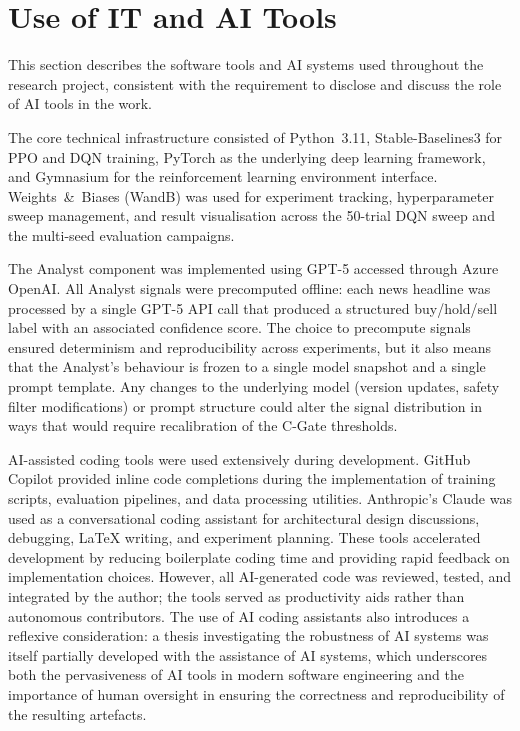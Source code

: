 \section{Use of IT and AI Tools}
\label{sec:disc-tools}

This section describes the software tools and AI systems used throughout the
research project, consistent with the requirement to disclose and discuss the
role of AI tools in the work.

The core technical infrastructure consisted of Python~3.11,
Stable-Baselines3 \cite{raffin2021stable} for PPO and DQN training,
PyTorch as the underlying deep learning framework, and Gymnasium for the
reinforcement learning environment interface. Weights~\&~Biases (WandB) was
used for experiment tracking, hyperparameter sweep management, and result
visualisation across the 50-trial DQN sweep and the multi-seed evaluation
campaigns.

The Analyst component was implemented using GPT-5 accessed through Azure
OpenAI. All Analyst signals were precomputed offline: each news headline
was processed by a single GPT-5 API call that produced a structured
buy/hold/sell label with an associated confidence score. The choice to
precompute signals ensured determinism and reproducibility across
experiments, but it also means that the Analyst's behaviour is frozen to a
single model snapshot and a single prompt template. Any changes to the
underlying model (version updates, safety filter modifications) or prompt
structure could alter the signal distribution in ways that would require
recalibration of the C-Gate thresholds.

AI-assisted coding tools were used extensively during development. GitHub
Copilot provided inline code completions during the implementation of
training scripts, evaluation pipelines, and data processing utilities.
Anthropic's Claude was used as a conversational coding assistant for
architectural design discussions, debugging, LaTeX writing, and
experiment planning. These tools accelerated development by reducing
boilerplate coding time and providing rapid feedback on implementation
choices. However, all AI-generated code was reviewed, tested, and
integrated by the author; the tools served as productivity aids rather
than autonomous contributors. The use of AI coding assistants also
introduces a reflexive consideration: a thesis investigating the
robustness of AI systems was itself partially developed with the assistance
of AI systems, which underscores both the pervasiveness of AI tools in
modern software engineering and the importance of human oversight in
ensuring the correctness and reproducibility of the resulting artefacts.

